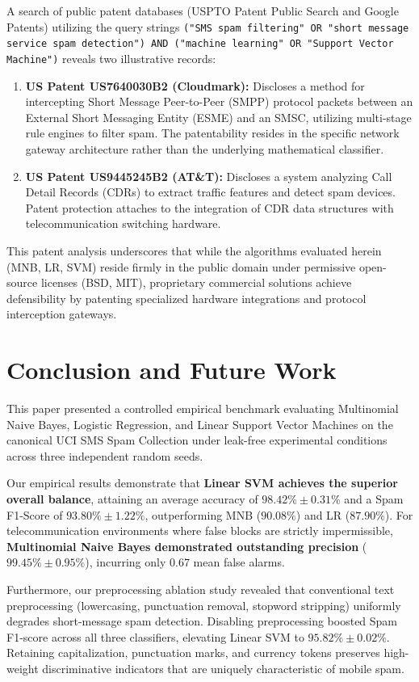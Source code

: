 \documentclass[conference]{IEEEtran}
\begin{document}
A search of public patent databases (USPTO Patent Public Search and Google Patents) utilizing the query strings \texttt{("SMS spam filtering" OR "short message service spam detection") AND ("machine learning" OR "Support Vector Machine")} reveals two illustrative records:
\begin{enumerate}
    \item \textbf{US Patent US7640030B2 (Cloudmark):} Discloses a method for intercepting Short Message Peer-to-Peer (SMPP) protocol packets between an External Short Messaging Entity (ESME) and an SMSC, utilizing multi-stage rule engines to filter spam. The patentability resides in the specific network gateway architecture rather than the underlying mathematical classifier.
    \item \textbf{US Patent US9445245B2 (AT\&T):} Discloses a system analyzing Call Detail Records (CDRs) to extract traffic features and detect spam devices. Patent protection attaches to the integration of CDR data structures with telecommunication switching hardware.
\end{enumerate}

This patent analysis underscores that while the algorithms evaluated herein (MNB, LR, SVM) reside firmly in the public domain under permissive open-source licenses (BSD, MIT), proprietary commercial solutions achieve defensibility by patenting specialized hardware integrations and protocol interception gateways.

\balance
\section{Conclusion and Future Work}
This paper presented a controlled empirical benchmark evaluating Multinomial Naive Bayes, Logistic Regression, and Linear Support Vector Machines on the canonical UCI SMS Spam Collection under leak-free experimental conditions across three independent random seeds. 

Our empirical results demonstrate that \textbf{Linear SVM achieves the superior overall balance}, attaining an average accuracy of $98.42\% \pm 0.31\%$ and a Spam F1-Score of $93.80\% \pm 1.22\%$, outperforming MNB ($90.08\%$) and LR ($87.90\%$). For telecommunication environments where false blocks are strictly impermissible, \textbf{Multinomial Naive Bayes demonstrated outstanding precision} ($99.45\% \pm 0.95\%$), incurring only $0.67$ mean false alarms. 

Furthermore, our preprocessing ablation study revealed that conventional text preprocessing (lowercasing, punctuation removal, stopword stripping) uniformly degrades short-message spam detection. Disabling preprocessing boosted Spam F1-score across all three classifiers, elevating Linear SVM to $95.82\% \pm 0.02\%$. Retaining capitalization, punctuation marks, and currency tokens preserves high-weight discriminative indicators that are uniquely characteristic of mobile spam.
\end{document}

